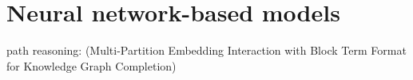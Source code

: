 


\section{Neural network-based models}\label{sec:emb-nn}



path reasoning: (Multi-Partition Embedding Interaction with Block Term Format for Knowledge Graph Completion)





